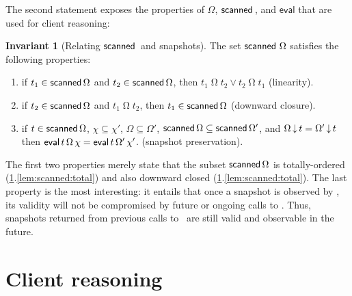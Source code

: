 \documentclass[a4paper,UKenglish]{lipics-v2016}
\newcommand{\hist}{\chi}
\newcommand{\stableorder}{\Omega}
\newcommand{\stableorderP}{\stableorder'}
\newcommand{\histP}{\chi'}
\theoremstyle{definition}
\newtheorem{invariant}[theorem]{Invariant}
\begin{document}
The second statement exposes the properties of $\stableorder$,
$\scanned$, and $\mathsf{eval}$ that are used for client reasoning:
%
\begin{invariant}[Relating $\scanned$ and snapshots]\label{lem:scanned}
The set $\scanned\, \stableorder$ satisfies the following properties:
%
\begin{enumerate}
 \item\label{lem:scanned:total} if $ t_1 \in
   \scanned{\stableorder}$ and $t_2 \in \scanned{\stableorder}$, then
   $ t_1 \mathrel{\stableorder} t_2 \vee t_2 \mathrel{\stableorder}
   t_1 $ (linearity).
  
 \item \label{lem:scanned:wkn} if $ t_2 \in
   \scanned{\stableorder}$ and $ t_1 \mathrel{\stableorder} t_2$, then
   $t_1 \in \scanned{\stableorder}$ (downward closure).

   
\item \label{lem:scanned:eval} if $t \in \scanned{\stableorder}$,
  $\hist \subseteq \histP$, $\stableorder \subseteq \stableorderP$,
  $\scanned{\stableorder} \subseteq \scanned{\stableorderP}$, and $
  \ideal{\stableorder}{t} = \ideal{\stableorderP}{t}$ then $ \eval\,
  t\, \stableorder\, \hist = \eval\, t\, \stableorderP\,
  \histP$. (snapshot preservation).
\end{enumerate}
\end{invariant}

The first two properties merely state that the subset
$\scanned{\stableorder}$ is totally-ordered
(\ref{lem:scanned}.\ref{lem:scanned:total}) and also downward closed
(\ref{lem:scanned}.\ref{lem:scanned:total}). The last property is the
most interesting: it entails that once a snapshot is observed by
\jyscan, its validity will not be compromised by future or ongoing
calls to \jywrite. Thus, snapshots returned from previous calls to
\jyscan~are still valid and observable in the future.




\section{Client reasoning}
\label{sc:clients}
\end{document}
